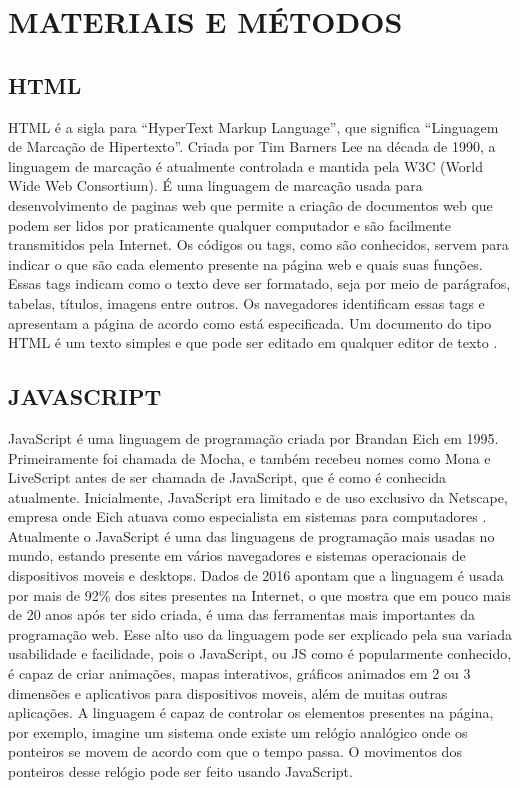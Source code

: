 \section{MATERIAIS E MÉTODOS}
\subsection{HTML}
HTML é a sigla para “HyperText Markup Language”, que significa “Linguagem de Marcação de Hipertexto”. Criada por Tim Barners Lee na década de 1990, a linguagem de marcação é atualmente controlada e mantida pela W3C (World Wide Web Consortium). É uma linguagem de marcação usada para desenvolvimento de paginas web que permite a criação de documentos web que podem ser lidos por praticamente qualquer computador e são facilmente transmitidos pela Internet.
Os códigos ou tags, como são conhecidos, servem para indicar o que são cada elemento presente na página web e quais suas funções. Essas tags indicam como o texto deve ser formatado, seja por meio de parágrafos, tabelas, títulos, imagens entre outros. Os navegadores identificam essas tags e apresentam a página de acordo como está especificada. Um documento do tipo HTML é um texto simples e que pode ser editado em qualquer editor de texto \cite{Andrei2019}.

\subsection{JAVASCRIPT}
JavaScript é uma linguagem de programação criada por Brandan Eich em 1995. Primeiramente foi chamada de Mocha, e também recebeu nomes como Mona e LiveScript antes de ser chamada de JavaScript, que é como é conhecida atualmente. Inicialmente, JavaScript era limitado e de uso exclusivo da Netscape, empresa onde Eich atuava como especialista em sistemas para computadores \cite{Andrei2019a}. 
Atualmente o JavaScript é uma das linguagens de programação mais usadas no mundo, estando presente em vários navegadores e sistemas operacionais de dispositivos moveis e desktops. Dados de 2016 apontam que a linguagem é usada por mais de 92\% dos sites presentes na Internet, o que mostra que em pouco mais de 20 anos após ter sido criada, é uma das ferramentas mais importantes da programação web.
Esse alto uso da linguagem pode ser explicado pela sua variada usabilidade e facilidade, pois o JavaScript, ou JS como é popularmente conhecido, é capaz de criar animações, mapas interativos, gráficos animados em 2 ou 3 dimensões e aplicativos para dispositivos moveis, além de muitas outras aplicações. A linguagem é capaz de controlar os elementos presentes na página, por exemplo, imagine um sistema onde existe um relógio analógico onde os ponteiros se movem de acordo com que o tempo passa. O movimentos dos ponteiros desse relógio pode ser feito usando JavaScript.

